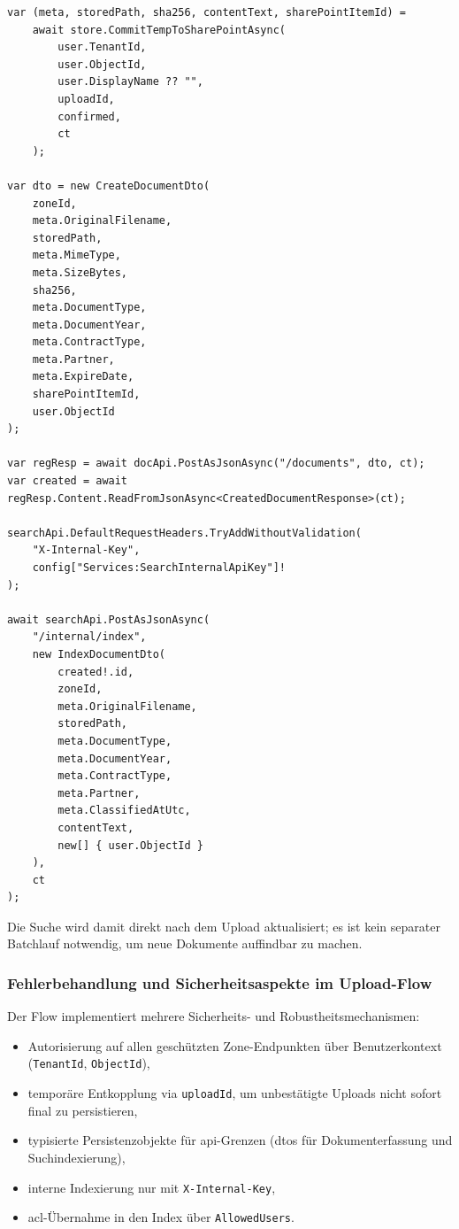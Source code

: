 \begin{lstlisting}[language={[Sharp]C},caption={Commit-Endpunkt mit Metadatenpersistenz und Indexierung},label={lst:upload-commit-endpoint}]
var (meta, storedPath, sha256, contentText, sharePointItemId) =
    await store.CommitTempToSharePointAsync(
        user.TenantId,
        user.ObjectId,
        user.DisplayName ?? "",
        uploadId,
        confirmed,
        ct
    );

var dto = new CreateDocumentDto(
    zoneId,
    meta.OriginalFilename,
    storedPath,
    meta.MimeType,
    meta.SizeBytes,
    sha256,
    meta.DocumentType,
    meta.DocumentYear,
    meta.ContractType,
    meta.Partner,
    meta.ExpireDate,
    sharePointItemId,
    user.ObjectId
);

var regResp = await docApi.PostAsJsonAsync("/documents", dto, ct);
var created = await regResp.Content.ReadFromJsonAsync<CreatedDocumentResponse>(ct);

searchApi.DefaultRequestHeaders.TryAddWithoutValidation(
    "X-Internal-Key",
    config["Services:SearchInternalApiKey"]!
);

await searchApi.PostAsJsonAsync(
    "/internal/index",
    new IndexDocumentDto(
        created!.id,
        zoneId,
        meta.OriginalFilename,
        storedPath,
        meta.DocumentType,
        meta.DocumentYear,
        meta.ContractType,
        meta.Partner,
        meta.ClassifiedAtUtc,
        contentText,
        new[] { user.ObjectId }
    ),
    ct
);
\end{lstlisting}

Die Suche wird damit direkt nach dem Upload aktualisiert; es ist kein separater Batchlauf notwendig, um neue Dokumente auffindbar zu machen.

\subsubsection{Fehlerbehandlung und Sicherheitsaspekte im Upload-Flow}

Der Flow implementiert mehrere Sicherheits- und Robustheitsmechanismen:
\begin{itemize}
    \item Autorisierung auf allen geschützten Zone-Endpunkten über Benutzerkontext (\texttt{TenantId}, \texttt{ObjectId}),
    \item temporäre Entkopplung via \texttt{uploadId}, um unbestätigte Uploads nicht sofort final zu persistieren,
    \item typisierte Persistenzobjekte für \acrshort{api}-Grenzen (\acrshort{dto}s für Dokumenterfassung und Suchindexierung),
    \item interne Indexierung nur mit \texttt{X-Internal-Key},
    \item \acrshort{acl}-Übernahme in den Index über \texttt{AllowedUsers}.
\end{itemize}

